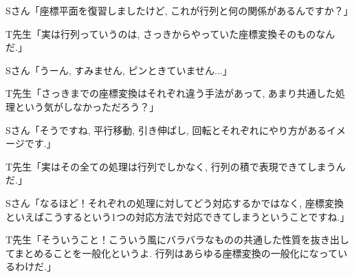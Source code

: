 \documentclass[a4paper,12pt]{jreport}
\theoremstyle{definition}
\begin{document}
   Sさん「座標平面を復習しましたけど,
   これが行列と何の関係があるんですか？」

   T先生「実は行列っていうのは,
   さっきからやっていた座標変換そのものなんだ.」

   Sさん「うーん,
   すみません,
   ピンときていません...」

   T先生「さっきまでの座標変換はそれぞれ違う手法があって,
   あまり共通した処理という気がしなかっただろう？」

   Sさん「そうですね,
   平行移動, 引き伸ばし, 回転とそれぞれにやり方があるイメージです.」

   T先生「実はその全ての処理は行列でしかなく,
   行列の積で表現できてしまうんだ.」

   Sさん「なるほど！それぞれの処理に対してどう対応するかではなく,
   座標変換といえばこうするという1つの対応方法で対応できてしまうということですね.」

   T先生「そういうこと！こういう風にバラバラなものの共通した性質を抜き出してまとめることを一般化というよ.
   行列はあらゆる座標変換の一般化になっているわけだ.」
\end{document}
